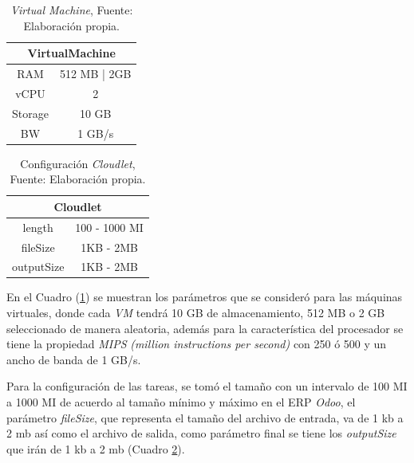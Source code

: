 \documentclass[jou,apacite]{apa6}
\begin{document}
\newpage

\setcounter{table}{2}
\renewcommand\thetable{\arabic{table}}
\begin{table}[h!]
	\centering
	\begin{tabular}{@{}cc@{}}
		\toprule
		\multicolumn{2}{c}{{\bf VirtualMachine}} \\ \midrule
		RAM               & 512 MB | 2GB          \\
		vCPU              & 2           \\
		Storage           & 10 GB                \\ 
		BW                & 1 GB/s    
		\\ \bottomrule          
	\end{tabular}
	\caption{\textit{Virtual Machine}, Fuente: Elaboraci\'on propia.}
	\label{tab:machine}
\end{table}


\setcounter{table}{3}
\renewcommand\thetable{\arabic{table}}
\begin{table}[h!]
	\centering
	\begin{tabular}{@{}cc@{}}
		\toprule
		\multicolumn{2}{c}{{\bf Cloudlet}} \\ \midrule
		length           & 100 - 1000 MI       \\
		fileSize     & 1KB - 2MB      \\
		outputSize           & 1KB - 2MB      \\ \midrule
	  
	\end{tabular}
	\caption{Configuraci\'on \textit{Cloudlet}, Fuente: Elaboraci\'on propia.}
	\label{tab:cloudlet}
\end{table}


En el Cuadro (\ref{tab:machine}) se muestran los par\'ametros que se consider\'o para las m\'aquinas virtuales, donde cada \textit{VM} tendr\'a 10 GB de almacenamiento, 512 MB  o 2 GB seleccionado de manera aleatoria, adem\'as para la caracter\'istica del procesador se tiene  la propiedad \textit{MIPS} \textit{(million instructions per second)} con 250 \'o 500 y un ancho de banda de 1 GB/s.

Para la configuraci\'on de las tareas, se tom\'o el tamaño con un intervalo de 100 MI a 1000 MI de acuerdo al tamaño mínimo y máximo en el ERP \textit{Odoo},  el par\'ametro \textit{fileSize}, que representa el tamaño del archivo de entrada, va de 1 kb a 2 mb as\'i como el archivo de salida, como par\'ametro final se tiene los \textit{outputSize} que ir\'an de 1 kb a 2 mb (Cuadro \ref{tab:cloudlet}).
\end{document}
